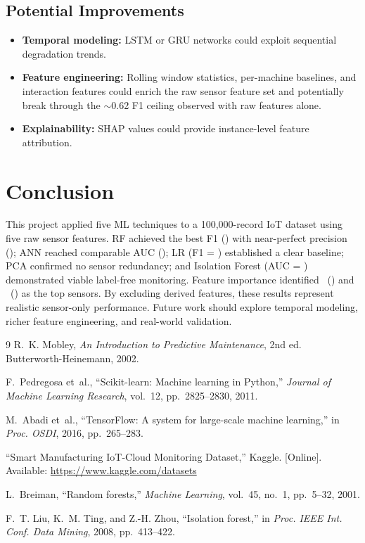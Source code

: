 \documentclass[11pt]{article}
\begin{document}
\subsection{Potential Improvements}

\begin{itemize}[noitemsep]
    \item \textbf{Temporal modeling:} LSTM or GRU networks could exploit sequential degradation trends.
    \item \textbf{Feature engineering:} Rolling window statistics, per-machine baselines, and interaction features could enrich the raw sensor feature set and potentially break through the $\sim$0.62 F1 ceiling observed with raw features alone.
    \item \textbf{Explainability:} SHAP values could provide instance-level feature attribution.
\end{itemize}

\section{Conclusion}

This project applied five ML techniques to a 100,000-record IoT dataset using five raw sensor features. RF achieved the best F1 (\rfFone) with near-perfect precision (\rfPrec); ANN reached comparable AUC (\annAuc); LR (F1 = \lrFone) established a clear baseline; PCA confirmed no sensor redundancy; and Isolation Forest (AUC = \isoAuc) demonstrated viable label-free monitoring. Feature importance identified \rfImpNameA\ (\rfImpA) and \rfImpNameB\ (\rfImpB) as the top sensors. By excluding derived features, these results represent realistic sensor-only performance. Future work should explore temporal modeling, richer feature engineering, and real-world validation.

\begin{thebibliography}{9}
R.~K. Mobley, \textit{An Introduction to Predictive Maintenance}, 2nd ed. Butterworth-Heinemann, 2002.

F.~Pedregosa et~al., ``Scikit-learn: Machine learning in Python,'' \textit{Journal of Machine Learning Research}, vol.~12, pp.~2825--2830, 2011.

M.~Abadi et~al., ``TensorFlow: A system for large-scale machine learning,'' in \textit{Proc. OSDI}, 2016, pp.~265--283.

``Smart Manufacturing IoT-Cloud Monitoring Dataset,'' Kaggle. [Online]. Available: \url{https://www.kaggle.com/datasets}

L.~Breiman, ``Random forests,'' \textit{Machine Learning}, vol.~45, no.~1, pp.~5--32, 2001.

F.~T. Liu, K.~M. Ting, and Z.-H. Zhou, ``Isolation forest,'' in \textit{Proc. IEEE Int. Conf. Data Mining}, 2008, pp.~413--422.
\end{thebibliography}
\end{document}
